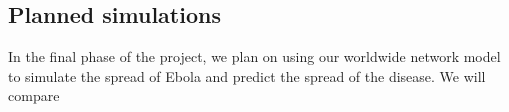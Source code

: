 \documentclass[10pt, journal,onecolumn]{IEEEtran}
\begin{document}
\subsection*{\textbf{Planned simulations}}

In the final phase of the project, we plan on using our worldwide network model to simulate the
spread of Ebola and predict the spread of the disease. We will compare 








\begin{appendix}



\end{appendix}
\end{document}
